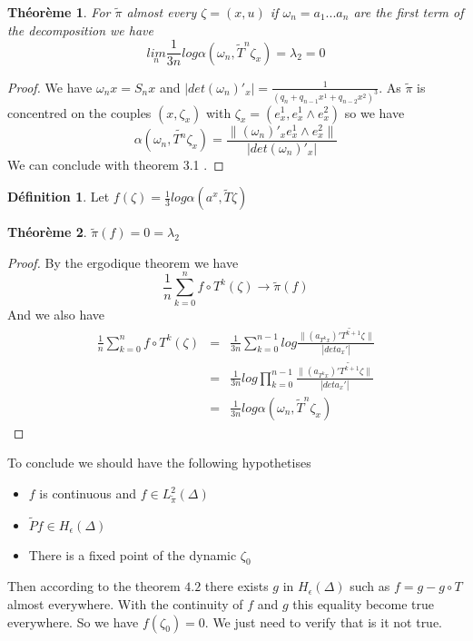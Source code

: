 \documentclass[12pt]{article}
\theoremstyle{plain}%
\newtheorem{thm}{Théorème}[section]
\theoremstyle{definition}
\newtheorem{dfnt}{Définition}[section]
\theoremstyle{remark}
\begin{document}
\begin{thm} For $\tilde{\pi}$ almost every $\zeta=(x,u)$ if $\omega_n=a_1 ... a_n$ are the first term of the decomposition we have \[
\underset{n}{lim} \frac{1}{3n} log \alpha(\omega_n,\tilde{T}^n \zeta_x)=\lambda_2=0
\]
\end{thm}

\begin{proof}
We have $\omega_n x = S_n x$ and $|det (\omega_n)'_x |=\frac{1}{(q_n+q_{n-1}x^1+q_{n-2}x^2)^3}$. As $\tilde{\pi}$ is concentred on the couples $(x,\zeta_x)$ with $\zeta_x=(e^1_x,e^1_x \land e^2_x)$ so we have \[
\alpha(\omega_n,\tilde{T^n}\zeta_x)=\frac{\| (\omega_n)'_x  e^1_x \land e^2_x\|}{| det (\omega_n)'_x |}
\]
We can conclude with theorem 3.1 .
\end{proof}

\begin{dfnt}
Let $f(\zeta)=\frac{1}{3} log \alpha (a^x, \tilde{T} \zeta)$
\end{dfnt}

\begin{thm}
$\tilde{\pi}(f)=0=\lambda_2$
\end{thm}

\begin{proof}
By the ergodique theorem we have \[
\frac{1}{n} \sum_{k=0}^n f \circ T^k (\zeta) \to \tilde{\pi}(f)
\]
And we also have \[\begin{aligned}
\frac{1}{n} \sum_{k=0}^n f \circ T^k (\zeta) & = & \frac{1}{3n} \sum_{k=0}^{n-1} log \frac{ \| (a_{T^k x})' \tilde{T^{k+1}} \zeta \| }{| det a_x'|}\\
 &=& \frac{1}{3n} log \prod_{k=0}^{n-1} \frac{ \| (a_{T^k x})' \tilde{T^{k+1}} \zeta \| }{| det a_x'|} \\
 &=&  \frac{1}{3n} log \alpha(\omega_n,\tilde{T}^n \zeta_x)
\end{aligned}
\]
\end{proof}

To conclude we should have the following hypothetises
\begin{itemize}
\item $f$ is continuous and $f \in L^2_{\tilde{\pi}}(\Delta)$
\item $\tilde{P}f \in H_\epsilon (\Delta)$
\item There is a fixed point of the dynamic $\zeta_0$
\end{itemize}
Then according to the theorem $4.2$ there exists $g$ in $H_\epsilon(\Delta)$ such as $f=g-g \circ T$ almost everywhere. With the continuity of $f$ and $g$ this equality become true everywhere.\newline
So we have $f(\zeta_0)=0$. We just need to verify that is it not true.
\end{document}
